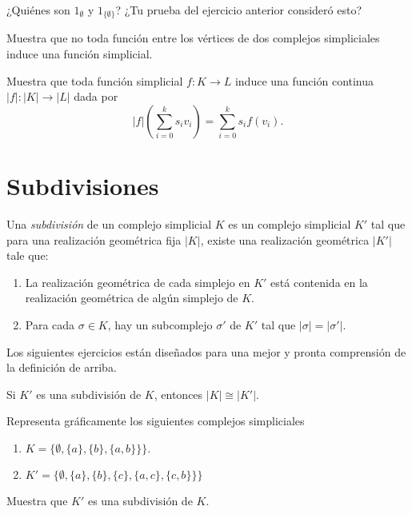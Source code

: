 \documentclass{standalone}
\begin{document}
	\begin{exercise}
		¿Quiénes son $1_{\emptyset}$ y $1_{\{\emptyset\}}$? ¿Tu prueba del ejercicio anterior consideró esto?
	\end{exercise}
	
	\begin{exercise}\label{rem:coeherent_gluing}
		Muestra que no toda función entre los vértices de dos complejos simpliciales induce una función simplicial. 
	\end{exercise}
	
	\begin{exercise}
		Muestra que toda función simplicial $f\colon K\rightarrow L$ induce una función continua $|f|\colon |K|\rightarrow |L|$ dada por 
		\[
		|f|(\sum_{i=0}^{k}s_{i}v_{i})= \sum_{i=0}^{k}s_{i}f(v_{i}).
		\]
	\end{exercise}
	
	\section{Subdivisiones}
	\begin{definition}\label{def:subdivision}
		Una \emph{subdivisión} de un complejo simplicial $K$ es un complejo simplicial $K'$ tal que para una realización geométrica fija $|K|$, existe una realización geométrica $|K'|$ tale que:
		
		\begin{enumerate}
			\item La realización geométrica de cada simplejo en $K'$ está contenida en la realización geométrica de algún simplejo de $K$.
			\item Para cada $\sigma\in K$, hay un subcomplejo $\sigma'$ de $K'$ tal que $|\sigma|=|\sigma'|$.
		\end{enumerate}
	\end{definition}
	
	Los siguientes ejercicios están diseñados para una mejor y pronta comprensión de la definición de arriba.
	
	\begin{exercise}\label{ex:subdivision_same_geom}
		Si $K'$ es una subdivisión de $K$, entonces $|K|\cong|K'|$.
	\end{exercise}
	
	\begin{exercise}
		Representa gráficamente los siguientes complejos simpliciales
		\begin{enumerate}
			\item  $K=\{\emptyset, \{a\}, \{b\}, \{a,b\}\}\}$.
			\item  $K'=\{\emptyset, \{a\}, \{b\}, \{c\}, \{a,c\}, \{c,b\}\}\}$
		\end{enumerate}
		Muestra que $K'$ es una subdivisión de $K$.
	\end{exercise}
	
\end{document}
